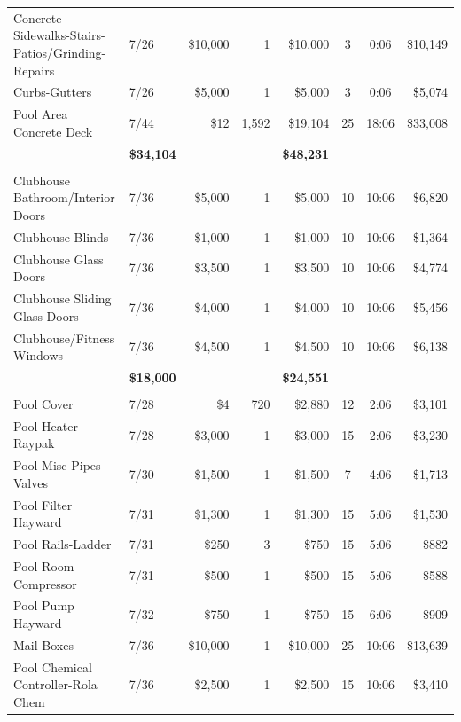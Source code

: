 \documentclass[11pt,letterpaper]{article}
\begin{document}
\begin{longtable}{p{4.2cm} p{1.6cm} r r r c c r}
Concrete Sidewalks-Stairs-Patios/Grinding-Repairs & 7/26 & \$10,000 & 1 & \$10,000 & 3 & 0:06 & \$10,149 \\
\rowcolor{blue!12} Curbs-Gutters & 7/26 & \$5,000 & 1 & \$5,000 & 3 & 0:06 & \$5,074 \\
Pool Area Concrete Deck & 7/44 & \$12 & 1,592 & \$19,104 & 25 & 18:06 & \$33,008 \\
\addlinespace[1pt] \multicolumn{4}{r}{} & \textbf{\$34,104} & & & \textbf{\$48,231} \\
\addlinespace[6pt]
\multicolumn{8}{l}{\textbf{Doors-Windows}} \\
\rowcolor{blue!12} Clubhouse Bathroom/Interior Doors & 7/36 & \$5,000 & 1 & \$5,000 & 10 & 10:06 & \$6,820 \\
Clubhouse Blinds & 7/36 & \$1,000 & 1 & \$1,000 & 10 & 10:06 & \$1,364 \\
\rowcolor{blue!12} Clubhouse Glass Doors & 7/36 & \$3,500 & 1 & \$3,500 & 10 & 10:06 & \$4,774 \\
Clubhouse Sliding Glass Doors & 7/36 & \$4,000 & 1 & \$4,000 & 10 & 10:06 & \$5,456 \\
\rowcolor{blue!12} Clubhouse/Fitness Windows & 7/36 & \$4,500 & 1 & \$4,500 & 10 & 10:06 & \$6,138 \\
\addlinespace[1pt] \multicolumn{4}{r}{} & \textbf{\$18,000} & & & \textbf{\$24,551} \\
\addlinespace[6pt]
\multicolumn{8}{l}{\textbf{Equipment}} \\
Pool Cover & 7/28 & \$4 & 720 & \$2,880 & 12 & 2:06 & \$3,101 \\
\rowcolor{blue!12} Pool Heater Raypak & 7/28 & \$3,000 & 1 & \$3,000 & 15 & 2:06 & \$3,230 \\
Pool Misc Pipes Valves & 7/30 & \$1,500 & 1 & \$1,500 & 7 & 4:06 & \$1,713 \\
\rowcolor{blue!12} Pool Filter Hayward & 7/31 & \$1,300 & 1 & \$1,300 & 15 & 5:06 & \$1,530 \\
Pool Rails-Ladder & 7/31 & \$250 & 3 & \$750 & 15 & 5:06 & \$882 \\
\rowcolor{blue!12} Pool Room Compressor & 7/31 & \$500 & 1 & \$500 & 15 & 5:06 & \$588 \\
Pool Pump Hayward & 7/32 & \$750 & 1 & \$750 & 15 & 6:06 & \$909 \\
\rowcolor{blue!12} Mail Boxes & 7/36 & \$10,000 & 1 & \$10,000 & 25 & 10:06 & \$13,639 \\
Pool Chemical Controller-Rola Chem & 7/36 & \$2,500 & 1 & \$2,500 & 15 & 10:06 & \$3,410 \\

\end{longtable}
\end{document}
